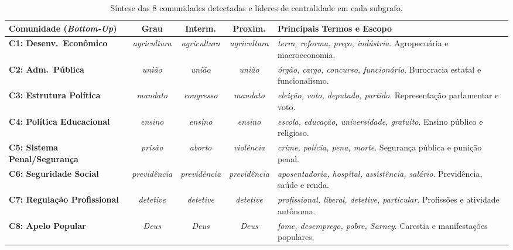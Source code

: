\documentclass[12pt]{article}
\begin{document}
\begin{table}[htb]
\centering
\caption{Síntese das 8 comunidades detectadas e líderes de centralidade em cada subgrafo.}
\label{tab:comunidades}
\footnotesize
\setlength{\tabcolsep}{4pt}
\begin{tabular}{p{3.8cm}cccp{5.8cm}}
\toprule
\textbf{Comunidade (\textit{Bottom-Up})} & \textbf{Grau} & \textbf{Interm.} & \textbf{Proxim.} & \textbf{Principais Termos e Escopo} \\
\midrule
\textbf{C1: Desenv.\ Econômico} & \textit{agricultura} & \textit{agricultura} & \textit{agricultura} & \textit{terra, reforma, preço, indústria}. Agropecuária e macroeconomia. \\
\addlinespace[2pt]
\textbf{C2: Adm.\ Pública} & \textit{união} & \textit{união} & \textit{união} & \textit{órgão, cargo, concurso, funcionário}. Burocracia estatal e funcionalismo. \\
\addlinespace[2pt]
\textbf{C3: Estrutura Política} & \textit{mandato} & \textit{congresso} & \textit{mandato} & \textit{eleição, voto, deputado, partido}. Representação parlamentar e voto. \\
\addlinespace[2pt]
\textbf{C4: Política Educacional} & \textit{ensino} & \textit{ensino} & \textit{ensino} & \textit{escola, educação, universidade, gratuito}. Ensino público e religioso. \\
\addlinespace[2pt]
\textbf{C5: Sistema Penal/Segurança} & \textit{prisão} & \textit{aborto} & \textit{violência} & \textit{crime, polícia, pena, morte}. Segurança pública e punição penal. \\
\addlinespace[2pt]
\textbf{C6: Seguridade Social} & \textit{previdência} & \textit{previdência} & \textit{previdência} & \textit{aposentadoria, hospital, assistência, salário}. Previdência, saúde e renda. \\
\addlinespace[2pt]
\textbf{C7: Regulação Profissional} & \textit{detetive} & \textit{detetive} & \textit{detetive} & \textit{profissional, liberal, detetive, particular}. Profissões e atividade autônoma. \\
\addlinespace[2pt]
\textbf{C8: Apelo Popular} & \textit{Deus} & \textit{Deus} & \textit{Deus} & \textit{fome, desemprego, pobre, Sarney}. Carestia e manifestações populares. \\
\bottomrule
\end{tabular}
\end{table}
\end{document}
